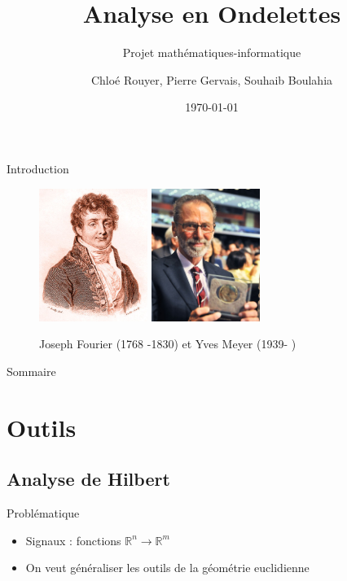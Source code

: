 \documentclass[french]{beamer}
\title{Analyse en Ondelettes}
\subtitle{Projet mathématiques-informatique}
\author[Rouyer, Gervais, Boulahia ]{ Chloé Rouyer, Pierre Gervais,  Souhaib Boulahia}
\date{\today}
\institute{Université Paris Diderot}
\begin{document}
\begin{frame}
	\titlepage
\end{frame}


\begin{frame}{Introduction}
	
	\begin{figure}[h]
		\centering
		\includegraphics[width=100pt]{Fourier.jpg}
		\includegraphics[width=100pt]{Meyer.jpg}
		\caption*{Joseph Fourier (1768 -1830) et Yves Meyer (1939- )}
	\end{figure}
	
\end{frame}

\begin{frame}{Sommaire}
	\tableofcontents
\end{frame}

\section{Outils}

\subsection{Analyse de Hilbert}
\begin{frame}{Problématique}
	
	\begin{itemize}
		\item<1-> Signaux : fonctions $\mathbb{R}^n \rightarrow \mathbb{R}^m$
		\item<2-> On veut généraliser les outils de la géométrie euclidienne
	\end{itemize}
		
\end{frame}
\end{document}
